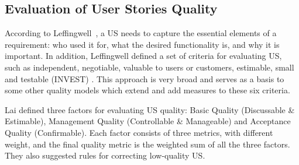 \subsection{Evaluation  of User Stories Quality}





According to Leffingwell~\cite{leffingwell2010agileINVEST}, a US needs to capture the essential elements of a requirement: who used it for, what the desired functionality is, and why it is important. In addition, Leffingwell defined a set of criteria for evaluating US, such as independent, negotiable, valuable to users or customers, estimable, small and testable (INVEST) \cite{leffingwell2010agileINVEST}. This approach is very broad and serves as a basis to some other quality models which extend and add measures to these six criteria.


Lai \cite{lai2017user} defined three factors for evaluating US quality: Basic Quality (Discussable \& Estimable), Management Quality (Controllable \& Manageable) and Acceptance Quality (Confirmable). Each factor consists of three metrics, with different weight, and the final quality metric is the weighted sum of all the three factors. 
They also suggested rules for correcting low-quality US. 

